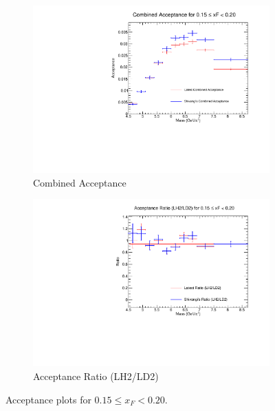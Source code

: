 \documentclass[11pt]{article}
\begin{document}
\begin{figure}[p]
\begin{subfigure}[b]{0.48\textwidth}
       \includegraphics[width=\linewidth]{./acceptancePlots/Combined_acceptance_xF_bin_3.pdf}
       \caption{Combined Acceptance}
    \end{subfigure}\hfill
    \begin{subfigure}[b]{0.48\textwidth}
       \includegraphics[width=\linewidth]{./acceptancePlots/Acceptance_ratio_xF_bin_3.pdf}
       \caption{Acceptance Ratio (LH2/LD2)}
    \end{subfigure}
    \caption{Acceptance plots for $0.15 \le x_F < 0.20$.}
\end{figure}
\end{document}
